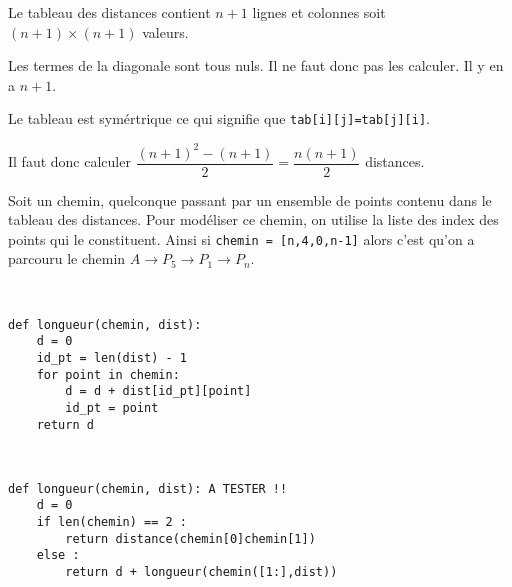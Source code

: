 \ifprof
\begin{corrige}
Le tableau des distances contient  $n+1$ lignes et colonnes soit  $(n+1)\times (n+1)$ valeurs. 

Les termes de la diagonale sont tous nuls. Il ne faut donc pas les calculer. Il y en a $n+1$. 

Le tableau est symértrique ce qui signifie que \texttt{tab[i][j]=tab[j][i]}. 

Il faut donc calculer $\dfrac{(n+1)^2-(n+1)}{2}=\dfrac{n(n+1)}{2}$ distances.

\end{corrige}
\else
\fi

\vspace{.25cm}

Soit un chemin, quelconque passant par un ensemble de points contenu dans le tableau des distances. Pour modéliser ce chemin, on utilise la liste des index des points qui le constituent. 
Ainsi si \texttt{chemin = [n,4,0,n-1]} alors c'est qu'on a parcouru le chemin $A\to P_5 \to P_1 \to P_n$. 



\ifprof
\begin{corrige}~\\ \vspace{-.5cm}
\begin{lstlisting}
def longueur(chemin, dist):
    d = 0
    id_pt = len(dist) - 1
    for point in chemin:
        d = d + dist[id_pt][point]
        id_pt = point
    return d
\end{lstlisting}
\end{corrige}
\else
\fi


\ifprof
\begin{corrige}~\\  \vspace{-.5cm}
\begin{lstlisting}
def longueur(chemin, dist): A TESTER !!
    d = 0
    if len(chemin) == 2 :
        return distance(chemin[0]chemin[1])
    else : 
        return d + longueur(chemin([1:],dist))
\end{lstlisting}
\end{corrige}
\else
\fi
\ifprof
\else
\vspace{.25cm}


